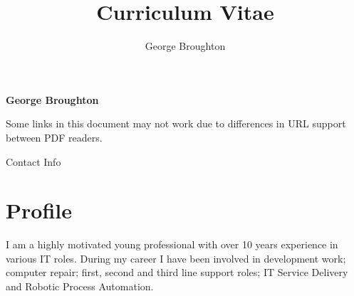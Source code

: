 \documentclass{report}
\title{Curriculum Vitae}
\author{George Broughton}
\begin{document}
	\begin{minipage}{0.8\textwidth}\raggedright
		\begin{Huge}
			\textbf{George Broughton}
			\newline
		\end{Huge}
		\newline
		\newline
		\LARGE
			\href{https://www.linkedin.com/in/george-broughton}{\faLinkedinSquare}
			\href{https://github.com/GeorgeBroughton}{\faGithubSquare}
			\href{MAILTO:george.daniel.broughton@outlook.com}{\faEnvelopeSquare} \raisebox{.3ex}{\normalsize george.daniel.broughton@outlook.com}
			\href{TEL:07487245012}{\faPhoneSquare} \raisebox{.3ex}{\normalsize 07487 245 012}
			\href{https://www.google.com/maps/dir/?api=1&origin=LS25+7DU&destination=Your+Location&travelmode=transit&dir_action=navigate}{\faMapMarker} \raisebox{.3ex}{\normalsize LS25 7DU}
			\newline
			\newline
			\tiny Some links in this document may not work due to differences in URL support between PDF readers.
	\end{minipage}%
	\hfill%
	\begin{minipage}{0.9in}\centering
		\newline
		\newline
		\footnotesize Contact Info
	\end{minipage}
	
	\section*{Profile}
		I am a highly motivated young professional with over 10 years experience in various IT roles.
		During my career I have been involved in development work; computer repair; first,
		second and third line support roles; IT Service Delivery and Robotic Process Automation.
	
\end{document}

